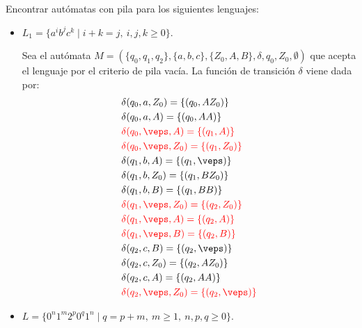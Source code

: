 \begin{ejercicio}\label{ej:1.5.16}
    Encontrar autómatas con pila para los siguientes lenguajes:
    \begin{itemize}
        \item $L_1 = \{a^i b^j c^k \mid i+k = j,\ i,j,k\geq 0\}$.
        
        Sea el autómata $M = (\{q_0,q_1,q_2\},\{a,b,c\},\{Z_0,A,B\},\delta,q_0,Z_0,\emptyset)$ que acepta el lenguaje por el criterio de pila vacía. La función de transición $\delta$ viene dada por:
        \begin{align*}
            &\delta(q_0,a,Z_0) = \{(q_0,AZ_0)\} \\
            &\delta(q_0,a,A) = \{(q_0,AA)\} \\
            &\red{\delta(q_0,\veps,A) = \{(q_1,A)\}} \\
            &\red{\delta(q_0,\veps,Z_0) = \{(q_1,Z_0)\}} \\
            &\delta(q_1,b,A) = \{(q_1,\veps)\} \\
            &\delta(q_1,b,Z_0) = \{(q_1,BZ_0)\} \\
            &\delta(q_1,b,B) = \{(q_1,BB)\} \\
            &\red{\delta(q_1,\veps,Z_0) = \{(q_2,Z_0)\}} \\
            &\red{\delta(q_1,\veps,A) = \{(q_2,A)\}} \\
            &\red{\delta(q_1,\veps,B) = \{(q_2,B)\}} \\
            &\delta(q_2,c,B) = \{(q_2,\veps)\} \\
            &\delta(q_2,c,Z_0) = \{(q_2,AZ_0)\} \\
            &\delta(q_2,c,A) = \{(q_2,AA)\} \\
            &\red{\delta(q_2,\veps,Z_0) = \{(q_2,\veps)\}}
        \end{align*}

        \item $L = \{0^n 1^m 2^p 0^q 1^n \mid q = p + m,\ m\geq 1,\ n,p,q\geq 0\}$.
        

\end{itemize}
\end{ejercicio}
